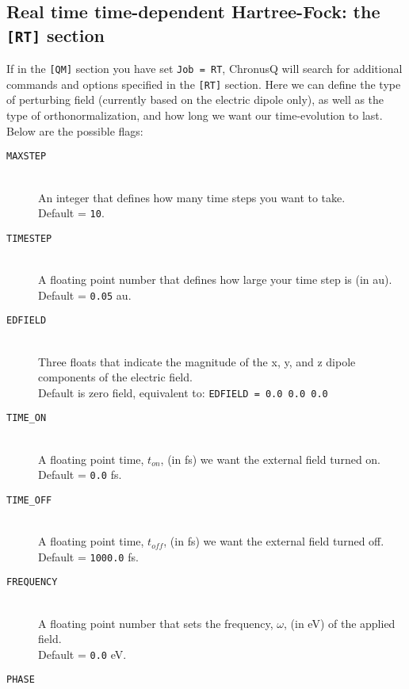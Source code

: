 \documentclass[12pt]{article}
\begin{document}
    \subsection{Real time time-dependent Hartree-Fock: the \texttt{[RT]} section} \label{subsec:RTInput}
    If in the \texttt{[QM]} section you have set \texttt{Job = RT}, ChronusQ will search for additional commands and options specified in the \texttt{[RT]} section. Here we can define the type of perturbing field (currently based on the electric dipole only), as well as the type of orthonormalization, and how long we want our time-evolution to last. Below are the possible flags:
    \begin{description}
      \item[\texttt{MAXSTEP}] \hfill \\ 
        An integer that defines how many time steps you want to take. \\
         Default = \texttt{10}.
      \item[\texttt{TIMESTEP}] \hfill \\ 
        A floating point number that defines how large your time step is (in au).  \\
        Default = \texttt{0.05} au.
      \item[\texttt{EDFIELD}] \hfill \\ 
        Three floats that indicate the magnitude of the x, y, and z dipole components of the electric field. \\
          Default is zero field, equivalent to: \texttt{EDFIELD = 0.0 0.0 0.0}
      \item[\texttt{TIME\_ON}] \hfill \\ 
        A floating point time, $t_{on}$, (in fs) we want the external field turned on. \\
        Default = \texttt{0.0} fs.
      \item[\texttt{TIME\_OFF}] \hfill \\ 
        A floating point time, $t_{off}$, (in fs) we want the external field turned off. \\
        Default = \texttt{1000.0} fs.
      \item[\texttt{FREQUENCY}] \hfill \\ 
        A floating point number that sets the frequency, $\omega$, (in eV) of the applied field. \\
        Default = \texttt{0.0} eV.
      \item[\texttt{PHASE}] \hfill \\ 

\end{description}
\end{document}
